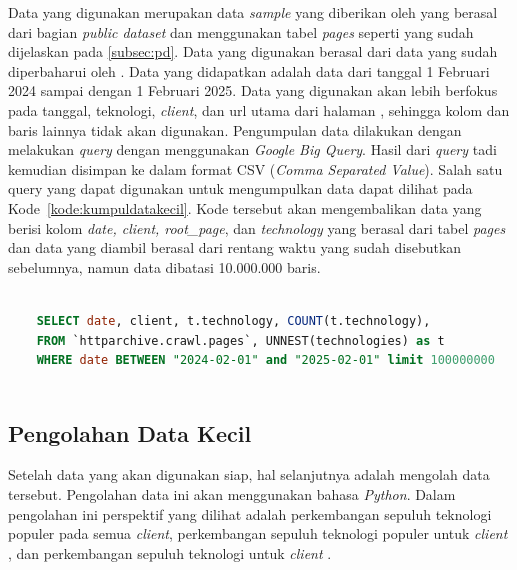 Data yang digunakan merupakan data \textit{sample} yang diberikan oleh \http yang berasal dari bagian \textit{public dataset} dan menggunakan tabel \textit{pages} seperti yang sudah dijelaskan pada \ref{subsec:pd}. Data yang digunakan berasal dari data yang sudah diperbaharui oleh \http. Data yang didapatkan adalah data dari tanggal 1 Februari 2024 sampai dengan 1 Februari 2025. Data yang digunakan akan lebih berfokus pada tanggal, teknologi, \textit{client}, dan url utama dari halaman \web, sehingga kolom dan baris lainnya tidak akan digunakan. Pengumpulan data dilakukan dengan melakukan \textit{query} dengan menggunakan \textit{Google Big Query}. Hasil dari \textit{query} tadi kemudian disimpan ke dalam format CSV (\textit{Comma Separated Value}). Salah satu query yang dapat digunakan untuk mengumpulkan data dapat dilihat pada Kode~\ref{kode:kumpuldatakecil}. Kode tersebut akan mengembalikan data yang berisi kolom \textit{date, client, root\_page}, dan \textit{technology} yang berasal dari tabel \textit{pages} dan data yang diambil berasal dari rentang waktu yang sudah disebutkan sebelumnya, namun data dibatasi 10.000.000 baris.

\begin{lstlisting}[language=SQL, caption=Kode untuk mengumpulkan data kecil, label=kode:kumpuldatakecil]

    SELECT date, client, t.technology, COUNT(t.technology),  
    FROM `httparchive.crawl.pages`, UNNEST(technologies) as t 
    WHERE date BETWEEN "2024-02-01" and "2025-02-01" limit 100000000
    
\end{lstlisting}

\subsection{Pengolahan Data Kecil}
\label{subsec:pengolahankecil}

Setelah data yang akan digunakan siap, hal selanjutnya adalah mengolah data tersebut. Pengolahan data ini akan menggunakan bahasa \textit{Python}. Dalam pengolahan ini perspektif yang dilihat adalah perkembangan sepuluh teknologi populer pada semua \textit{client}, perkembangan sepuluh teknologi populer untuk \textit{client} \mobile, dan perkembangan sepuluh teknologi untuk \textit{client} \desktop.

